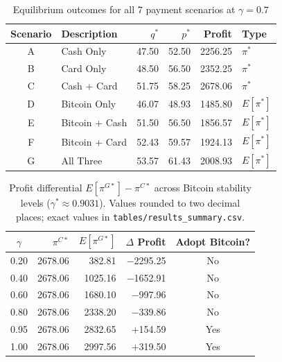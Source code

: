 
\begin{table}[h]
\centering
\caption{Equilibrium outcomes for all 7 payment scenarios at $\gamma = 0.7$}
\label{tab:equilibrium_baseline}
\begin{tabular}{clrrrl}
\toprule
Scenario & Description & $q^*$ & $p^*$ & Profit & Type \\
\midrule
A & Cash Only              & 47.50 & 52.50 & 2256.25 & $\pi^*$ \\
B & Card Only              & 48.50 & 56.50 & 2352.25 & $\pi^*$ \\
C & Cash + Card            & 51.75 & 58.25 & 2678.06 & $\pi^*$ \\
D & Bitcoin Only           & 46.07 & 48.93 & 1485.80 & $E[\pi^*]$ \\
E & Bitcoin + Cash         & 51.50 & 56.50 & 1856.57 & $E[\pi^*]$ \\
F & Bitcoin + Card         & 52.43 & 59.57 & 1924.13 & $E[\pi^*]$ \\
G & All Three              & 53.57 & 61.43 & 2008.93 & $E[\pi^*]$ \\
\bottomrule
\end{tabular}
\end{table}

\begin{table}[h]
\centering
\caption{Profit differential $E[\pi^{G*}] - \pi^{C*}$ across Bitcoin stability
levels ($\gamma^* \approx 0.9031$). Values rounded to two decimal places;
exact values in \texttt{tables/results\_summary.csv}.}
\label{tab:profit_comparison}
\begin{tabular}{crrrc}
\toprule
$\gamma$ & $\pi^{C*}$ & $E[\pi^{G*}]$ & $\Delta$ Profit & Adopt Bitcoin? \\
\midrule
0.20 & 2678.06 &   382.81 & $-$2295.25 & No \\
0.40 & 2678.06 &  1025.16 & $-$1652.91 & No \\
0.60 & 2678.06 &  1680.10 &  $-$997.96 & No \\
0.80 & 2678.06 &  2338.20 &  $-$339.86 & No \\
0.95 & 2678.06 &  2832.65 &  $+$154.59 & Yes \\
1.00 & 2678.06 &  2997.56 &  $+$319.50 & Yes \\
\bottomrule
\end{tabular}
\end{table}


